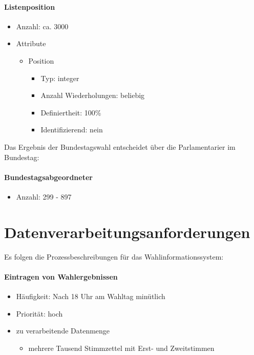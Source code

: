 \documentclass[a4paper]{article}
\begin{document}
\paragraph{Listenposition}
\begin{itemize}
\item Anzahl: ca. 3000
\item Attribute
	\begin{itemize}
	\item Position
		\begin{itemize}
		\item Typ: integer
		\item Anzahl Wiederholungen: beliebig
		\item Definiertheit: 100\%
		\item Identifizierend: nein
		\end{itemize}
	\end{itemize}
\end{itemize}

Das Ergebnis der Bundestagswahl entscheidet über die Parlamentarier im Bundestag:

\paragraph{Bundestagsabgeordneter}
\begin{itemize}
\item Anzahl: 299 - 897
\end{itemize}

\section{Datenverarbeitungsanforderungen}

Es folgen die Prozessbeschreibungen für das Wahlinformationssystem:

\paragraph{Eintragen von Wahlergebnissen}
\begin{itemize}
\item Häufigkeit: Nach 18 Uhr am Wahltag minütlich
\item Priorität: hoch
\item zu verarbeitende Datenmenge
\begin{itemize}
	\item mehrere Tausend Stimmzettel mit Erst- und Zweitstimmen
\end{itemize}
\end{itemize}
\end{document}
